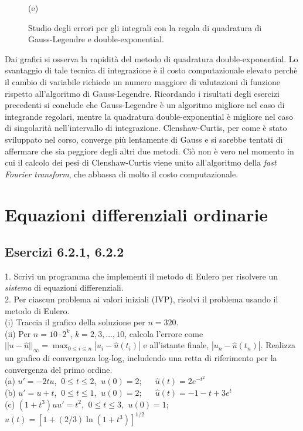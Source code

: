 \documentclass[letterpaper, 12pt]{article}
\numberwithin{equation}{section}    %
\begin{document}
\begin{figure}[!ht]
\begin{minipage}[b]{0.47\textwidth}
        \caption*{(e)}
    \end{minipage}
    \caption{Studio degli errori per gli integrali con la regola di quadratura di Gauss-Legendre e double-exponential.}
    \label{fig:es5_4_3_1}
\end{figure}

Dai grafici si osserva la rapidità del metodo di quadratura double-exponential. Lo svantaggio di tale tecnica
di integrazione è il costo computazionale elevato perchè il cambio di variabile richiede un numero
maggiore di valutazioni di funzione rispetto all'algoritmo di Gauss-Legendre. Ricordando i risultati
degli esercizi precedenti si conclude che Gauss-Legendre è un algoritmo migliore nel caso di integrande 
regolari, mentre la quadratura double-exponential è migliore nel caso di singolarità nell'intervallo di 
integrazione. Clenshaw-Curtis, per come è stato sviluppato nel corso, converge più lentamente di Gauss e 
si sarebbe tentati di affermare che sia peggiore degli altri due metodi. Ciò non è vero nel momento in cui
il calcolo dei pesi di Clenshaw-Curtis viene unito all'algoritmo della \textit{fast Fourier transform},
che abbassa di molto il costo computazionale.

\section{Equazioni differenziali ordinarie}
\subsection{Esercizi 6.2.1, 6.2.2}
1. Scrivi un programma che implementi il metodo di Eulero per risolvere un \textit{sistema} 
di equazioni differenziali.\\
2. Per ciascun problema ai valori iniziali (IVP), risolvi il problema usando il metodo di Eulero. \\
(i) Traccia il grafico della soluzione per $n=320$. \\
(ii) Per $n=10\cdot2^k$, $k=2,3,\ldots,10$, calcola l'errore come 
$||u-\hat{u}||_\infty=\max_{0\leq i\leq n} |u_i-\hat{u}(t_i)|$ e all'istante finale, $|u_n-\hat{u}(t_n)|$. 
Realizza un grafico di convergenza log-log, includendo una retta di riferimento per la convergenza del 
primo ordine.\\
(a) $u' = -2t u$, $\ 0 \le t \le 2$, $\ u(0) = 2$;  
$\quad$ $\hat{u}(t) = 2e^{-t^2}$ \\
(b) $u' = u + t$, $\ 0 \le t \le 1$, $\ u(0) = 2$;  
$\quad$ $\hat{u}(t) = -1-t+3e^t$ \\
(c) $(1+t^3)uu' = t^2$, $\ 0 \le t \le 3$, $\ u(0) =1$; 
$\quad$ $\hat{u}(t) = [1+(2/3)\ln (1+t^3)]^{1/2}$
\end{document}
